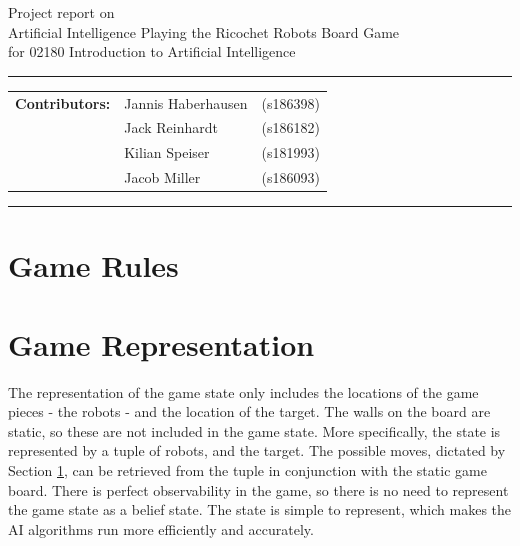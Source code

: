 \documentclass[a4paper,10pt]{article}
\begin{document}
\begin{center}
Project report on\\
\vspace{0.5cm}
{{\Large \sc Artificial Intelligence Playing the Ricochet Robots Board Game}}\\
\vspace{0.5cm} for 02180 Introduction to Artificial Intelligence
\end{center}
\rule{\textwidth}{0.5pt}
\begin{description}
\item\begin{tabular}{rll}
    \textbf{Contributors:}& Jannis Haberhausen &(s186398)\\ & Jack Reinhardt &(s186182)\\ & Kilian Speiser &(s181993)\\ & Jacob Miller &(s186093) \\
\end{tabular}
\end{description}
\rule{\textwidth}{1pt}

\tableofcontents
\thispagestyle{empty}
\newpage
\section{Game Rules}
\label{sec:gameRules}

\section{Game Representation}
\label{sec:gameRep}
The representation of the game state only includes the locations of the game pieces - the robots - and the location of the target. The walls on the board are static, so these are not included in the game state. More specifically, the state is represented by a tuple of robots, and the target. The possible moves, dictated by Section \ref{sec:gameRules}, can be retrieved from the tuple in conjunction with the static game board. There is perfect observability in the game, so there is no need to represent the game state as a belief state. The state is simple to represent, which makes the AI algorithms run more efficiently and accurately.
\end{document}
